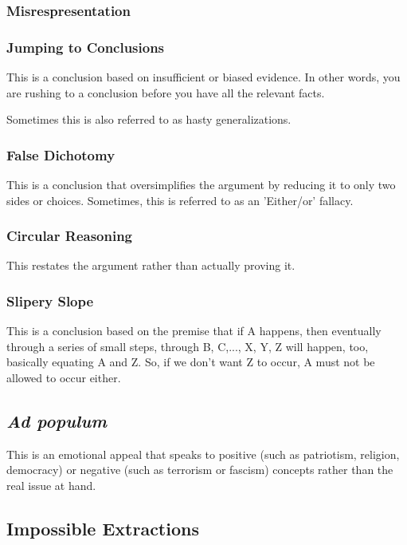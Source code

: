 \documentclass{article}\usepackage[]{graphicx}\usepackage[]{color}
\begin{document}
\subsubsection{Misrespresentation}

\subsubsection{Jumping to Conclusions}

This is a conclusion based on insufficient or biased evidence. In other words, you are rushing to a conclusion before you have all the relevant facts.

Sometimes this is also referred to as hasty generalizations. 

\subsubsection{False Dichotomy}

This is a conclusion that oversimplifies the argument by reducing it to only two sides or choices. Sometimes, this is referred to as an 'Either/or' fallacy.

\subsubsection{Circular Reasoning}

 This restates the argument rather than actually proving it.

\subsubsection{Slipery Slope}

This is a conclusion based on the premise that if A happens, then eventually through a series of small steps, through B, C,..., X, Y, Z will happen, too, basically equating A and Z. So, if we don't want Z to occur, A must not be allowed to occur either. 

\subsection{\emph{Ad populum}}

This is an emotional appeal that speaks to positive (such as patriotism, religion, democracy) or negative (such as terrorism or fascism) concepts rather than the real issue at hand. 

\subsection{Impossible Extractions}
\end{document}
